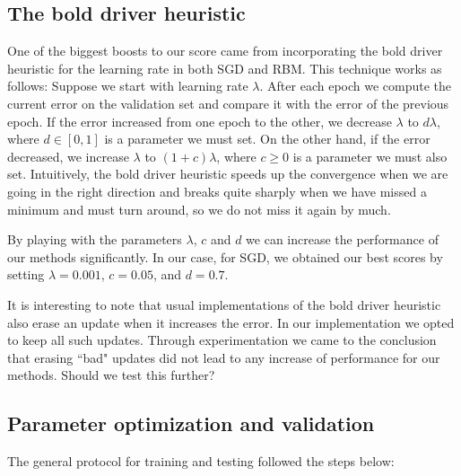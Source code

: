 \documentclass[10pt,conference,compsocconf]{IEEEtran}
\begin{document}
\subsection{The bold driver heuristic} 
One of the biggest boosts to our score came from incorporating the bold driver heuristic for the learning rate in both SGD and RBM. This technique works as follows: Suppose we start with learning rate $\lambda$. After each epoch we compute the current error on the validation set and compare it with the error of the previous epoch. If the error increased from one epoch to the other, we decrease $\lambda$ to $d\lambda$, where $d\in[0,1]$ is a parameter we must set. On the other hand, if the error decreased, we increase $\lambda$ to $(1+c)\lambda$, where $c\geq 0$ is a parameter we must also set. Intuitively, the bold driver heuristic speeds up the convergence when we are going in the right direction and breaks quite sharply when we have missed a minimum and must turn around, so we do not miss it again by much.

By playing with the parameters $\lambda$, $c$ and $d$ we can increase the performance of our methods significantly. In our case, for SGD, we obtained our best scores by setting $\lambda=0.001$, $c=0.05$, and $d=0.7$.

It is interesting to note that usual implementations of the bold driver heuristic also erase an update when it increases the error. In our implementation we opted to keep all such updates. Through experimentation we came to the conclusion that erasing ``bad" updates did not lead to any increase of performance for our methods. {\color{red} Should we test this further?}

\subsection{Parameter optimization and validation} 
The general protocol for training and testing followed the steps below:
\end{document}
